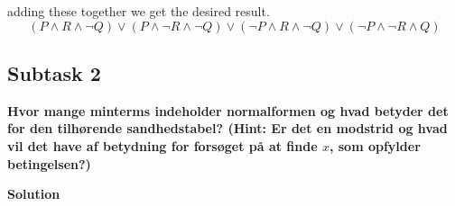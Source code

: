 adding these together we get the desired result.
\begin{equation}
    (P \wedge R \wedge \neg Q)\vee(P \wedge \neg R \wedge \neg Q)\vee(\neg P \wedge R \wedge \neg Q)\vee(\neg P \wedge \neg R \wedge Q)
\end{equation}

\subsection{Subtask 2}
\noindent
\textbf{Hvor mange minterms indeholder normalformen og hvad betyder det for den tilhørende sandhedstabel? (Hint: Er det en modstrid og hvad vil det have af betydning for forsøget på at finde $x$, som opfylder betingelsen?)}

\bigskip
\noindent
\textbf{Solution}

